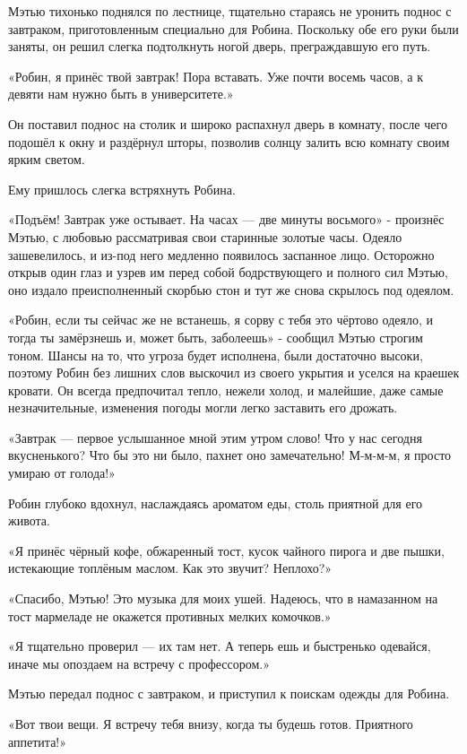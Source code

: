 \documentclass[a4paper,12pt]{book}
\begin{document}
Мэтью тихонько поднялся по лестнице, тщательно стараясь не уронить поднос с завтраком, приготовленным специально для Робина. Поскольку обе его руки были заняты, он решил слегка подтолкнуть ногой дверь, преграждавшую его путь.
\par
«Робин, я принёс твой завтрак! Пора вставать. Уже почти восемь часов, а к девяти нам нужно быть в университете.»
\par
Он поставил поднос на столик и широко распахнул дверь в комнату, после чего подошёл к окну и раздёрнул шторы, позволив солнцу залить всю комнату своим ярким светом.
\par
Ему пришлось слегка встряхнуть Робина.
\par
«Подъём! Завтрак уже остывает. На часах — две минуты восьмого» - произнёс Мэтью, с любовью рассматривая свои старинные золотые часы. Одеяло зашевелилось, и из-под него медленно появилось заспанное лицо. Осторожно открыв один глаз и узрев им перед собой бодрствующего и полного сил Мэтью, оно издало преисполненный скорбью стон и тут же снова скрылось под одеялом.
\par
«Робин, если ты сейчас же не встанешь, я сорву с тебя это чёртово одеяло, и тогда ты замёрзнешь и, может быть, заболеешь» - сообщил Мэтью строгим тоном. Шансы на то, что угроза будет исполнена, были достаточно высоки, поэтому Робин без лишних слов выскочил из своего укрытия и уселся на краешек кровати. Он всегда предпочитал тепло, нежели холод, и малейшие, даже самые незначительные, изменения погоды могли легко заставить его дрожать.
\par
«Завтрак — первое услышанное мной этим утром слово! Что у нас сегодня вкусненького? Что бы это ни было, пахнет оно замечательно! М-м-м-м, я просто умираю от голода!»
\par
Робин глубоко вдохнул, наслаждаясь ароматом еды, столь приятной для его живота.
\par
«Я принёс чёрный кофе, обжаренный тост, кусок чайного пирога и две пышки, истекающие топлёным маслом. Как это звучит? Неплохо?»
\par
«Спасибо, Мэтью! Это музыка для моих ушей. Надеюсь, что в намазанном на тост мармеладе не окажется противных мелких комочков.»
\par
«Я тщательно проверил — их там нет. А теперь ешь и быстренько одевайся, иначе мы опоздаем на встречу с профессором.»
\par
Мэтью передал поднос с завтраком, и приступил к поискам одежды для Робина.
\par
«Вот твои вещи. Я встречу тебя внизу, когда ты будешь готов. Приятного аппетита!»
\end{document}
